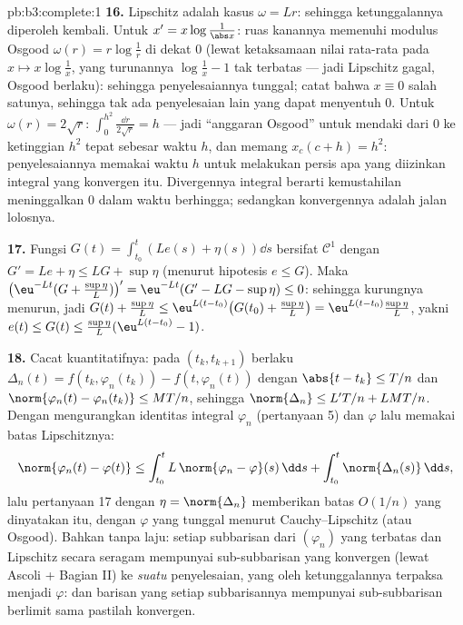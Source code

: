 \begin{solution}{pb:b3:complete:1}
\textbf{16.} Lipschitz adalah kasus $\omega = Lr$: sehingga ketunggalannya diperoleh kembali.
Untuk $x' = x\log\frac1{\abs x}$: ruas kanannya memenuhi
modulus Osgood $\omega(r) = r\log\frac1r$ di dekat $0$ (lewat ketaksamaan
nilai rata-rata pada $x \mapsto x\log\frac1x$, yang turunannya
$\log\frac1x - 1$ tak terbatas --- jadi Lipschitz gagal, Osgood
berlaku): sehingga penyelesaiannya tunggal; catat bahwa $x \equiv 0$ salah satunya, sehingga tak ada
penyelesaian lain yang dapat menyentuh $0$. Untuk $\omega(r) = 2\sqrt r$:
$\int_0^{h^2}\frac{\dd r}{2\sqrt r} = h$ --- jadi ``anggaran
Osgood'' untuk mendaki dari $0$ ke ketinggian $h^2$ tepat sebesar
waktu $h$, dan memang $x_c(c + h) = h^2$: penyelesaiannya memakai
waktu $h$ untuk melakukan persis apa yang diizinkan integral yang
konvergen itu. Divergennya integral berarti kemustahilan
meninggalkan $0$ dalam waktu berhingga; sedangkan konvergennya adalah jalan lolosnya.

\textbf{17.} Fungsi $G(t) = \int_{t_0}^t(Le(s) + \eta(s))\dd s$ bersifat
$\mathcal C^1$ dengan $G' = Le + \eta \leq LG + \sup\eta$
(menurut hipotesis $e \leq G$). Maka $\bigl(\eu^{-Lt}(G +
\tfrac{\sup\eta}L)\bigr)' = \eu^{-Lt}(G' - LG - \sup\eta)
\leq 0$: sehingga kurungnya menurun, jadi $G(t) + \frac{\sup\eta}L
\leq \eu^{L(t - t_0)}\bigl(G(t_0) + \frac{\sup\eta}L\bigr) =
\eu^{L(t-t_0)}\frac{\sup\eta}L$, yakni $e(t) \leq G(t) \leq
\frac{\sup\eta}L(\eu^{L(t-t_0)} - 1)$.

\textbf{18.} Cacat kuantitatifnya: pada $(t_k, t_{k+1})$ berlaku
$\Delta_n(t) = f(t_k, \varphi_n(t_k)) - f(t, \varphi_n(t))$
dengan $\abs{t - t_k} \leq T/n$ dan $\norm{\varphi_n(t) -
\varphi_n(t_k)} \leq MT/n$, sehingga $\norm{\Delta_n} \leq L'T/n +
LMT/n$. Dengan mengurangkan identitas integral $\varphi_n$
(pertanyaan 5) dan $\varphi$ lalu memakai batas Lipschitznya:
\[
\norm{\varphi_n(t) - \varphi(t)} \leq
\int_{t_0}^t L\,\norm{\varphi_n - \varphi}(s)\,\dd s +
\int_{t_0}^t\norm{\Delta_n(s)}\,\dd s,
\]
lalu pertanyaan 17 dengan $\eta = \norm{\Delta_n}$ memberikan
batas $O(1/n)$ yang dinyatakan itu, dengan $\varphi$ yang tunggal menurut
Cauchy--Lipschitz (atau Osgood). Bahkan tanpa laju: setiap
subbarisan dari $(\varphi_n)$ yang terbatas dan Lipschitz secara seragam
mempunyai sub-subbarisan yang konvergen (lewat Ascoli + Bagian II) ke
\emph{suatu} penyelesaian, yang oleh ketunggalannya terpaksa menjadi $\varphi$:
dan barisan yang setiap subbarisannya mempunyai sub-subbarisan
berlimit sama pastilah konvergen.


\end{solution}

